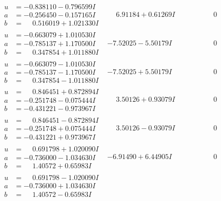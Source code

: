 \documentclass[1p]{elsarticle_modified}
\theoremstyle{definition}
\begin{document}
$$\begin{array}{c|c|c}
\begin{aligned}
u &= -0.838110 - 0.796599 I \\
a &= -0.256450 - 0.157165 I \\
b &= \phantom{-}0.516019 + 1.021330 I\end{aligned}
 & \phantom{-}6.91184 + 0.61269 I & \phantom{-0.000000 } 0 \\ \hline\begin{aligned}
u &= -0.663079 + 1.010530 I \\
a &= -0.785137 + 1.170500 I \\
b &= \phantom{-}0.347854 + 1.011880 I\end{aligned}
 & -7.52025 - 5.50179 I & \phantom{-0.000000 } 0 \\ \hline\begin{aligned}
u &= -0.663079 - 1.010530 I \\
a &= -0.785137 - 1.170500 I \\
b &= \phantom{-}0.347854 - 1.011880 I\end{aligned}
 & -7.52025 + 5.50179 I & \phantom{-0.000000 } 0 \\ \hline\begin{aligned}
u &= \phantom{-}0.846451 + 0.872894 I \\
a &= -0.251748 - 0.075444 I \\
b &= -0.431221 - 0.973967 I\end{aligned}
 & \phantom{-}3.50126 + 0.93079 I & \phantom{-0.000000 } 0 \\ \hline\begin{aligned}
u &= \phantom{-}0.846451 - 0.872894 I \\
a &= -0.251748 + 0.075444 I \\
b &= -0.431221 + 0.973967 I\end{aligned}
 & \phantom{-}3.50126 - 0.93079 I & \phantom{-0.000000 } 0 \\ \hline\begin{aligned}
u &= \phantom{-}0.691798 + 1.020090 I \\
a &= -0.736000 - 1.034630 I \\
b &= \phantom{-}1.40572 + 0.65983 I\end{aligned}
 & -6.91490 + 6.44905 I & \phantom{-0.000000 } 0 \\ \hline\begin{aligned}
u &= \phantom{-}0.691798 - 1.020090 I \\
a &= -0.736000 + 1.034630 I \\
b &= \phantom{-}1.40572 - 0.65983 I\end{aligned}

\end{array}$$
\end{document}
